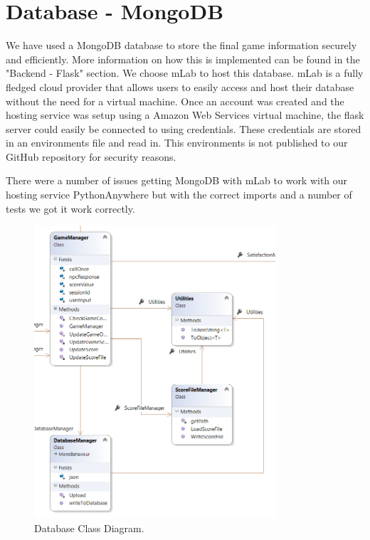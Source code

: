 \section{Database - MongoDB}
We have used a MongoDB database to store the final game information securely and efficiently. More information on how this is implemented can be found in the "Backend - Flask" section. We choose mLab to host this database. mLab is a fully fledged cloud provider that allows users to easily access and host their database without the need for a virtual machine. Once an account was created and the hosting service was setup using a Amazon Web Services virtual machine, the flask server could easily be connected to using credentials. These credentials are stored in an environments file and read in. This environments is not published to our GitHub repository for security reasons. 

There were a number of issues getting MongoDB with mLab to work with our hosting service PythonAnywhere but with the correct imports and a number of tests we got it work correctly.


\begin{figure}[ht]
	\caption{Database Class Diagram.}
	\label{image:Database}
	\centering
	\includegraphics[width=0.8\textwidth]{Images/ClassDiagram Database.png}
\end{figure}

